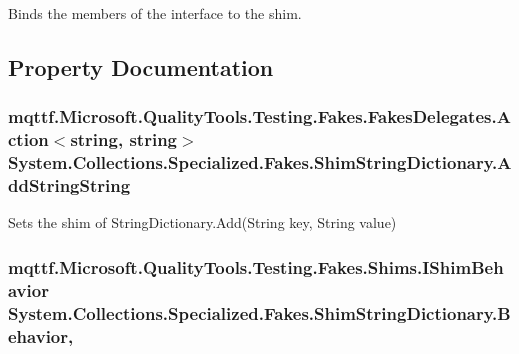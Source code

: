 Binds the members of the interface to the shim.



\subsection{Property Documentation}
\hypertarget{class_system_1_1_collections_1_1_specialized_1_1_fakes_1_1_shim_string_dictionary_aeca7c8a6048f64328e6132532432dadd}{
\subsubsection[{Add\-String\-String}]{\setlength{\rightskip}{0pt plus 5cm}mqttf.\-Microsoft.\-Quality\-Tools.\-Testing.\-Fakes.\-Fakes\-Delegates.\-Action$<$string, string$>$ System.\-Collections.\-Specialized.\-Fakes.\-Shim\-String\-Dictionary.\-Add\-String\-String\hspace{0.3cm}{\ttfamily [set]}}}\label{class_system_1_1_collections_1_1_specialized_1_1_fakes_1_1_shim_string_dictionary_aeca7c8a6048f64328e6132532432dadd}


Sets the shim of String\-Dictionary.\-Add(\-String key, String value)

\hypertarget{class_system_1_1_collections_1_1_specialized_1_1_fakes_1_1_shim_string_dictionary_a56851fce06fc98df52b4b250d3642dd6}{
\subsubsection[{Behavior}]{\setlength{\rightskip}{0pt plus 5cm}mqttf.\-Microsoft.\-Quality\-Tools.\-Testing.\-Fakes.\-Shims.\-I\-Shim\-Behavior System.\-Collections.\-Specialized.\-Fakes.\-Shim\-String\-Dictionary.\-Behavior\hspace{0.3cm}{\ttfamily [static]}, {\ttfamily [set]}}}\label{class_system_1_1_collections_1_1_specialized_1_1_fakes_1_1_shim_string_dictionary_a56851fce06fc98df52b4b250d3642dd6}


